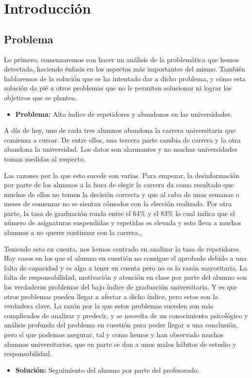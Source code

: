 \chapter{Introducción}
\section{Problema}

Lo primero, comenzaremos con hacer un análisis de la problemática que hemos detectado, haciendo énfasis en los aspectos más importantes del mismo. También hablaremos de la solución que se ha intentado dar a dicho problema, y cómo esta solución da pié a otros problemas que no le permiten solucionar ni lograr los objetivos que se plantea.
\begin{itemize}
\item{\textbf{Problema: }}Alto índice de repetidores y abandonos en las universidades.
\end{itemize}

A día de hoy, uno de cada tres alumnos abandona la carrera universitaria que comienza a cursar. De entre ellos, una tercera parte cambia de carrera y la otra abandona la universidad. Los datos son alarmantes y no muchas universidades toman medidas al respecto. 

Las razones por la que esto sucede son varias. Para empezar, la desinformación por parte de los alumnos a la hora de elegir la carrera da como resultado que muchos de ellos no tomen la decisión correcta y que al cabo de unas semanas o meses de comenzar no se sientan cómodos con la elección realizada. Por otra parte, la tasa de graduación ronda entre el 64\% y el 83\% lo cual indica que el número de asignaturas suspendidas y repetidas es elevada y esto lleva a muchos alumnos a no querer continuar con la carrera.\cite{elMundoProblema},\cite{stecylProblema}

Teniendo esto en cuenta, nos hemos centrado en analizar la tasa de repetidores. Hay casos en los que el alumno en cuestión no consigue el aprobado debido a una falta de capacidad y es algo a tener en cuenta pero no es la razón mayoritaria. La falta de responsabilidad, motivación y atención en clase por parte del alumno son los verdaderos problemas del bajo índice de graduación universitaria. Y es que otros problemas pueden llegar a afectar a dicho índice, pero estos son la verdadera clave. La razón por la que estos problemas suceden son más complicados de analizar y predecir, y se necesita de un conocimiento psicológico y análisis profundo del problema en cuestión para poder llegar a una conclusión, pero sí que podemos asegurar, tal y como hemos y han observado muchos alumnos universitarios, que en parte se dan a unos malos hábitos de estudio y responsabilidad.
\begin{itemize}
\item{\textbf{Solución: }}Seguimiento del alumno por parte del profesorado.
\end{itemize}

